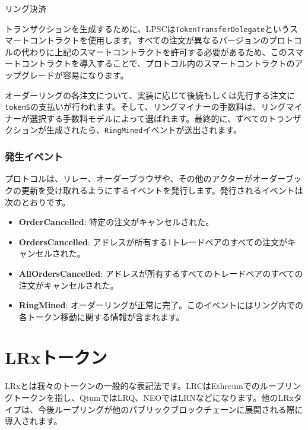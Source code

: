 \documentclass{article}
\makeatletter
\newenvironment{figurehere}
 {\def\@captype{figure}}
 {}
\makeatother
\begin{document}
\begin{multicols}{2}
\begin{center}
\begin{figurehere}
\caption{リング決済}
\label{fig:settlement}
\end{figurehere}
\end{center}

トランザクションを生成するために、LPSCは\verb|TokenTransferDelegate|というスマートコントラクトを使用します。すべての注文が異なるバージョンのプロトコルの代わりに上記のスマートコントラクトを許可する必要があるため、このスマートコントラクトを導入することで、プロトコル内のスマートコントラクトのアップグレードが容易になります。

オーダーリングの各注文について、実装に応じて後続もしくは先行する注文に\verb|tokenS|の支払いが行われます。そして、リングマイナーの手数料は、リングマイナーが選択する手数料モデルによって選ばれます。最終的に、すべてのトランザクションが生成されたら、\verb|RingMined|イベントが送出されます。

\subsubsection{発生イベント\label{sec:events}}

プロトコルは、リレー、オーダーブラウザや、その他のアクターがオーダーブックの更新を受け取れるようにするイベントを発行します。発行されるイベントは次のとおりです。

\begin{itemize}
	\item \textbf{OrderCancelled}: 特定の注文がキャンセルされた。
	\item \textbf{OrdersCancelled}: アドレスが所有する1トレードペアのすべての注文がキャンセルされた。
	\item \textbf{AllOrdersCancelled}: アドレスが所有するすべてのトレードペアのすべての注文がキャンセルされた。
	\item \textbf{RingMined}: オーダーリングが正常に完了。このイベントにはリング内での各トークン移動に関する情報が含まれます。
\end{itemize}


\section{LRxトークン\label{sec:token}}
LRxとは我々のトークンの一般的な表記法です。LRCはEthreumでのループリングトークンを指し、QtumではLRQ、NEOではLRNなどになります。他のLRxタイプは、今後ループリングが他のパブリックブロックチェーンに展開される際に導入されます。


\end{multicols}
\end{document}
